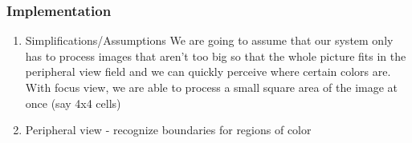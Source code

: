 \documentclass[11pt,a4paper,oneside]{scrartcl}
\begin{document}
\subsubsection{Implementation}
\label{sec-3-1-2}
\begin{enumerate}
\item Simplifications/Assumptions
\label{sec-3-1-2-1}
We are going to assume that our system only has to process images
that aren't too big so that the whole picture fits in the
peripheral view field and we can quickly perceive where certain
colors are.
With focus view, we are able to process a small square area of
the image at once (say 4x4 cells)
\item Peripheral view - recognize boundaries for regions of color
\label{sec-3-1-2-2}
\end{enumerate}
\end{document}
